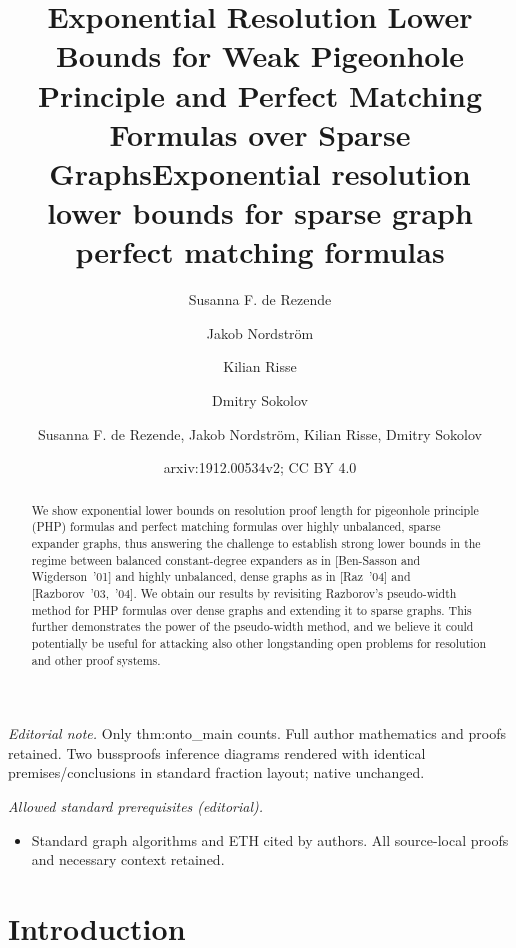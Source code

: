 \documentclass{article}
\author{Susanna F. de Rezende \and Jakob Nordström \and Kilian Risse \and Dmitry Sokolov}\date{}
\title{Exponential 
  Resolution
  Lower Bounds for Weak Pigeonhole Principle 
  and Perfect Matching Formulas over Sparse Graphs}
\title{Exponential resolution lower bounds for sparse graph perfect matching formulas}
\author{Susanna F. de Rezende, Jakob Nordström, Kilian Risse, Dmitry Sokolov}
\date{arxiv:1912.00534v2; CC BY 4.0}
\numberwithin{equation}{section}
\begin{document}
\maketitle
\noindent\textit{Editorial note.} Only thm:onto\_main counts. Full author mathematics and proofs retained. Two bussproofs inference diagrams rendered with identical premises/conclusions in standard fraction layout; native unchanged.\par\medskip
\noindent\textit{Allowed standard prerequisites (editorial).}\begin{itemize}
\item Standard graph algorithms and ETH cited by authors. All source-local proofs and necessary context retained.
\end{itemize}\medskip
\maketitle







\begin{abstract}
  We show exponential lower bounds on resolution proof length for
  pigeonhole principle (PHP) formulas and perfect matching formulas
  over highly unbalanced, sparse expander graphs, thus answering the
  challenge to establish strong lower bounds in the regime between
  balanced constant-degree expanders as in [Ben-Sasson and
  Wigderson~'01] and highly unbalanced, dense graphs as in [Raz~'04]
  and [Razborov~'03,~'04].  We obtain our results by revisiting
  Razborov's pseudo-width method for PHP formulas over dense graphs
  and extending it to sparse graphs. This further demonstrates the
  power of the pseudo-width method, and we believe it could
  potentially be useful for attacking also other longstanding open
  problems for resolution and other proof systems.
\end{abstract}

\section{Introduction}
\label{sec:intro}
\end{document}
